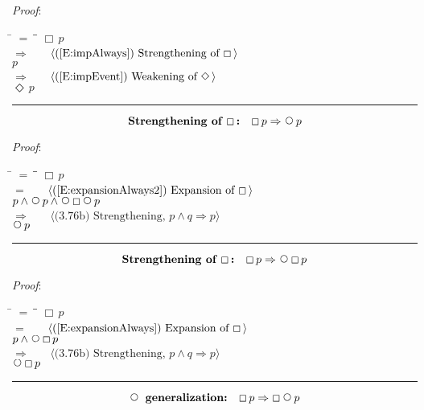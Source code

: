 \documentclass[12pt, fleqn, leqno]{article}
\newcommand{\lgap}{2pt}                             %
\newcommand{\mymathindent}{24pt}                    %
\newcommand{\impl}{\ensuremath{\Rightarrow}}        %
\newcommand{\Next}{\;\,\text{\raisebox{3.5pt}{\circle{6}}}}
\newcommand{\Event}{\Diamond\,}
\newcommand{\Always}{\Box\,}
\newcommand{\myqed}{\rule[-.23ex]{1.2ex}{2.0ex}}
\newcommand{\myqedtab}{\hspace{384pt}}              %
\newcommand{\Gll} {\langle}                         %
\newcommand{\Ggg} {\rangle}                         %
\newcommand{\Hint}[1]     {\ \ \ $\Gll              \mbox{#1} \Ggg$ }   %
\begin{document}
\emph{Proof}:
\begin{tabbing}
\hspace{\mymathindent} \= $= \;$ \= \myqedtab \= \kill
  \> \>   $\Always p$\\[\lgap]
  \> $\impl$  \>  \Hint{(\ref{E:impAlways}) Strengthening of $\Always$}\\[\lgap]
  \> \>   $p$\\[\lgap]
  \> $\impl$  \>  \Hint{(\ref{E:impEvent}) Weakening of $\Event$}\\[\lgap]
  \> \>   $\Event p$ \quad \myqed
\end{tabbing}
\begin{equation}\label{E:impAlwaysN}
\textbf{Strengthening of $\Always$:}\quad \Always p \impl \Next p
\end{equation}

\emph{Proof}:
\begin{tabbing}
\hspace{\mymathindent} \= $= \;$ \= \myqedtab \= \kill
  \> \>   $\Always p$\\[\lgap]
  \> $=$  \>  \Hint{(\ref{E:expansionAlways2}) Expansion of $\Always$}\\[\lgap]
  \> \>   $p \land \Next p \land \Next\Always\Next p$\\[\lgap]
  \> $\impl$  \>  \Hint{(3.76b) Strengthening, $p\land q \impl p$}\\[\lgap]
  \> \>   $\Next p$ \quad \myqed
\end{tabbing}
\begin{equation}\label{E:impAlwaysNA}
\textbf{Strengthening of $\Always$:}\quad \Always p \impl \Next\Always p
\end{equation}

\emph{Proof}:
\begin{tabbing}
\hspace{\mymathindent} \= $= \;$ \= \myqedtab \= \kill
  \> \>   $\Always p$\\[\lgap]
  \> $=$  \>  \Hint{(\ref{E:expansionAlways}) Expansion of $\Always$}\\[\lgap]
  \> \>   $p \land \Next\Always p$\\[\lgap]
  \> $\impl$  \>  \Hint{(3.76b) Strengthening, $p\land q \impl p$}\\[\lgap]
  \> \>   $\Next\Always p$ \quad \myqed
\end{tabbing}
\begin{equation}\label{E:impAlwaysAN}
\textbf{$\Next$ generalization:}\quad \Always p \impl \Always\Next p
\end{equation}
\end{document}
